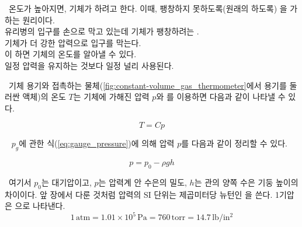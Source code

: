 \begin{sssbox}
\ 온도가 높아지면, 기체가 하려고 한다. 이때,
팽창하지 못하도록(원래의 하도록) 을 가하는 원리이다. \\

\bul 유리병의 입구를 손으로 막고 있는데 기체가 팽창하려는 . \\
\bul 기체가  더 강한 압력으로 입구를 막는다. \\
\bul 이 하면 기체의 온도를 알아낼 수 있다. \\

일정 압력을 유지하는 것보다 일정  널리 사용된다.
\end{sssbox}
\clearpage



\ 기체 용기와 접촉하는 물체(\autoref{fig:constant-volume_gas_thermometer}에서 용기를 둘러싼 액체)의
온도 $T$는 기체에 가해진 압력 $p$와 를 이용하면 다음과 같이 나타낼 수 있다.

\begin{equation} T = Cp
\label{eq:T_Cp}\end{equation}

\  $p_g$에 관한 식(\autoref{eq:gauge_pressure})에 의해 압력 $p$를 다음과 같이 정리할 수 있다.

\begin{equation} p=p_{0}-\rho gh \end{equation}

%
\ 여기서 $p_0$는 대기압이고, $p$는 압력계 안 수은의 밀도, $h$는 관의 양쪽 수은 기둥 높이의 차이이다.
앞 장에서 다룬 것처럼 압력의 SI 단위는 제곱미터당 뉴턴인 을 쓴다.
1기압은 으로 나타낸다. \\
\begin{equation*} 1\,\mathrm{atm} = 1.01 \times 10^5\,\mathrm{Pa} = 760\,\mathrm{torr} = 14.7\,\mathrm{lb/in^2} \end{equation*}

